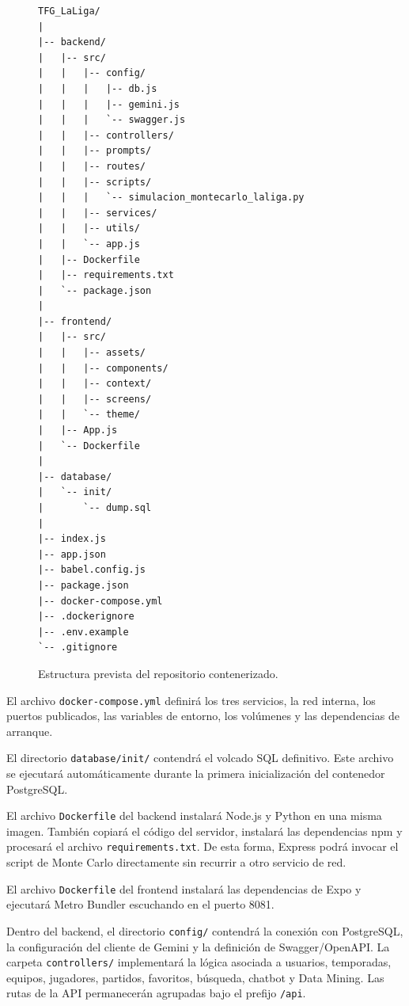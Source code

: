 \begin{figure}[H]
  \centering
  \begin{minipage}{0.92\textwidth}
\begin{lstlisting}
TFG_LaLiga/
|
|-- backend/
|   |-- src/
|   |   |-- config/
|   |   |   |-- db.js
|   |   |   |-- gemini.js
|   |   |   `-- swagger.js
|   |   |-- controllers/
|   |   |-- prompts/
|   |   |-- routes/
|   |   |-- scripts/
|   |   |   `-- simulacion_montecarlo_laliga.py
|   |   |-- services/
|   |   |-- utils/
|   |   `-- app.js
|   |-- Dockerfile
|   |-- requirements.txt
|   `-- package.json
|
|-- frontend/
|   |-- src/
|   |   |-- assets/
|   |   |-- components/
|   |   |-- context/
|   |   |-- screens/
|   |   `-- theme/
|   |-- App.js
|   `-- Dockerfile
|
|-- database/
|   `-- init/
|       `-- dump.sql
|
|-- index.js
|-- app.json
|-- babel.config.js
|-- package.json
|-- docker-compose.yml
|-- .dockerignore
|-- .env.example
`-- .gitignore
\end{lstlisting}
  \end{minipage}
  \caption{Estructura prevista del repositorio contenerizado.}
  \label{fig:estructura-repositorio}
\end{figure}

El archivo \texttt{docker-compose.yml} definir\'a los tres servicios, la red
interna, los puertos publicados, las variables de entorno, los vol\'umenes y las
dependencias de arranque.

El directorio \texttt{database/init/} contendr\'a el volcado SQL definitivo. Este
archivo se ejecutar\'a autom\'aticamente durante la primera inicializaci\'on del
contenedor PostgreSQL.

El archivo \texttt{Dockerfile} del backend instalar\'a Node.js y Python en una
misma imagen. Tambi\'en copiar\'a el c\'odigo del servidor, instalar\'a las
dependencias npm y procesar\'a el archivo \texttt{requirements.txt}. De esta
forma, Express podr\'a invocar el script de Monte Carlo directamente sin recurrir
a otro servicio de red.

El archivo \texttt{Dockerfile} del frontend instalar\'a las dependencias de Expo
y ejecutar\'a Metro Bundler escuchando en el puerto 8081.

Dentro del backend, el directorio \texttt{config/} contendr\'a la conexi\'on con
PostgreSQL, la configuraci\'on del cliente de Gemini y la definici\'on de
Swagger/OpenAPI. La carpeta \texttt{controllers/} implementar\'a la l\'ogica
asociada a usuarios, temporadas, equipos, jugadores, partidos, favoritos,
b\'usqueda, chatbot y Data Mining. Las rutas de la API permanecer\'an agrupadas
bajo el prefijo \texttt{/api}.

